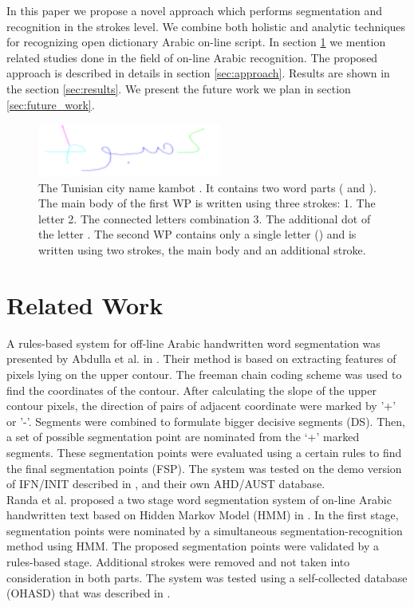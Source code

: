 \documentclass[journal,compsoc]{IEEEtran}
\begin{document}
In this paper we propose a novel approach which performs segmentation and recognition in the strokes level. We combine both holistic and analytic techniques for recognizing open dictionary Arabic on-line script. In section \ref{sec:related_word} we mention related studies done in the field of on-line Arabic recognition. The proposed approach is described in details in section \ref{sec:approach}. Results are shown in the section \ref{sec:results}. We present the future work we plan in section \ref{sec:future_work}.

\begin{figure}
\centering
\includegraphics[width=6cm]{./figures/kmbot_color}       
\caption{The Tunisian city name kambot . It contains two word parts ( and ). The main body of the first WP is written using three strokes: 1. The letter  2. The connected letters combination  3. The additional dot of the letter . The second WP contains only a single letter () and is written using two strokes, the main body and an additional stroke.}
\label{fig:kmbot}
\end{figure}

\section{Related Work}
\label{sec:related_word}
A rules-based system for off-line Arabic handwritten word segmentation was presented by Abdulla et al. in \cite{abdulla2008off}. Their method is based on extracting features of pixels lying on the upper contour. The freeman chain coding scheme was used to find the coordinates of the contour. After calculating the slope of the upper contour pixels, the direction of pairs of adjacent coordinate were marked by '+' or '-'. Segments were combined to formulate bigger decisive segments (DS). Then, a set of possible segmentation point are nominated from the ‘+’ marked segments. These segmentation points were evaluated using a certain rules to find the final segmentation points (FSP). The system was tested on the demo version of IFN/INIT described in \cite{pechwitz2002ifn} , and their own AHD/AUST database.\\

Randa et al. proposed a two stage word segmentation system of on-line Arabic handwritten text based on Hidden Markov Model (HMM) in \cite{elanwar2012unconstrained}. In the first stage, segmentation points were nominated by a simultaneous segmentation-recognition method using HMM. The proposed segmentation points were validated by a rules-based stage. Additional strokes were removed and not taken into consideration in both parts. The system was tested using a self-collected database (OHASD) that was described in \cite{elanwar2010ohasd}.\\
\end{document}
